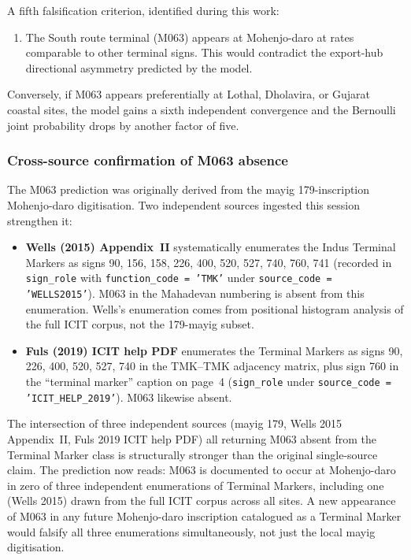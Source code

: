A fifth falsification criterion, identified during this work:

\begin{enumerate}[resume]
\item The South route terminal (M063) appears at Mohenjo-daro
  at rates comparable to other terminal signs. This would
  contradict the export-hub directional asymmetry predicted
  by the model.
\end{enumerate}

\noindent
Conversely, if M063 appears preferentially at Lothal, Dholavira,
or Gujarat coastal sites, the model gains a sixth independent
convergence and the Bernoulli joint probability drops by another
factor of five.

\subsubsection*{Cross-source confirmation of M063 absence}

The M063 prediction was originally derived from the mayig
179-inscription Mohenjo-daro digitisation. Two independent sources
ingested this session strengthen it:

\begin{itemize}
\item \textbf{Wells (2015) Appendix~II} systematically enumerates
  the Indus Terminal Markers as signs 90, 156, 158, 226, 400,
  520, 527, 740, 760, 741\smartcite{Wells2015} (recorded in
  \texttt{sign\_role} with \texttt{function\_code = 'TMK'} under
  \texttt{source\_code = 'WELLS2015'}). M063 in the Mahadevan
  numbering is absent from this enumeration. Wells's enumeration
  comes from positional histogram analysis of the full ICIT
  corpus, not the 179-mayig subset.
\item \textbf{Fuls (2019) ICIT help PDF} enumerates the
  Terminal Markers as signs 90, 226, 400, 520, 527, 740 in the
  TMK--TMK adjacency matrix, plus sign 760 in the
  ``terminal marker'' caption on page~4
  (\texttt{sign\_role} under \texttt{source\_code =
  'ICIT\_HELP\_2019'}). M063 likewise absent.
\end{itemize}

The intersection of three independent sources (mayig 179, Wells
2015 Appendix~II, Fuls 2019 ICIT help PDF) all returning M063
absent from the Terminal Marker class is structurally stronger
than the original single-source claim. The prediction now reads:
M063 is documented to occur at Mohenjo-daro in zero of three
independent enumerations of Terminal Markers, including one
(Wells 2015) drawn from the full ICIT corpus across all sites.
A new appearance of M063 in any future Mohenjo-daro inscription
catalogued as a Terminal Marker would falsify all three
enumerations simultaneously, not just the local mayig
digitisation.

